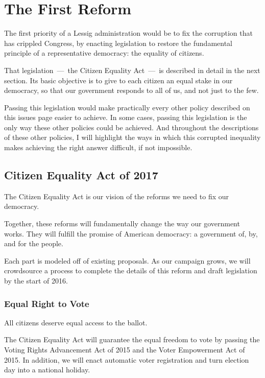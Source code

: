 \chapter{The First Reform}

The first priority of a Lessig administration would be to fix the corruption that has crippled Congress, by enacting legislation to restore the fundamental principle of a representative democracy: the equality of citizens.

That legislation~---~the Citizen Equality Act~---~is described in detail in the next section. 
Its basic objective is to give to each citizen an equal stake in our democracy, so that our government responds to all of us, and not just to the few.

Passing this legislation would make practically every other policy described on this issues page easier to achieve. In some cases, passing this legislation is the only way these other policies could be achieved. And throughout the descriptions of these other policies, I will highlight the ways in which this corrupted inequality makes achieving the right answer difficult, if not impossible.

\section{Citizen Equality Act of 2017}

The Citizen Equality Act is our vision of the reforms we need to fix our democracy.

Together, these reforms will fundamentally change the way our government works. They will fulfill the promise of American democracy: a government of, by, and for the people.

Each part is modeled off of existing proposals. As our campaign grows, we will crowdsource a process to complete the details of this reform and draft legislation by the start of 2016.

\subsection{Equal Right to Vote}

All citizens deserve equal access to the ballot.

The Citizen Equality Act will guarantee the equal freedom to vote by passing the Voting Rights Advancement Act of 2015 and the Voter Empowerment Act of 2015. In addition, we will enact automatic voter registration and turn election day into a national holiday.

